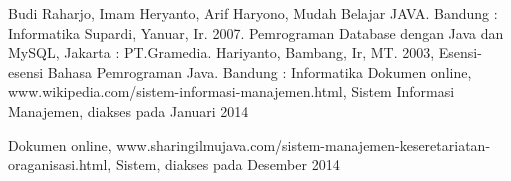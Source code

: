 \documentclass{jtetiproposalskripsi}
\begin{document}

\begin{thebibliography}{9}

Budi Raharjo, Imam Heryanto, Arif Haryono, Mudah Belajar JAVA. Bandung : Informatika
Supardi, Yanuar, Ir. 2007. Pemrograman Database dengan Java dan MySQL, Jakarta : PT.Gramedia.
Hariyanto, Bambang, Ir, MT. 2003, Esensi-esensi Bahasa Pemrograman Java. Bandung : Informatika
Dokumen online, www.wikipedia.com/sistem-informasi-manajemen.html, Sistem Informasi Manajemen, diakses pada Januari 2014

Dokumen online, www.sharingilmujava.com/sistem-manajemen-keseretariatan-oraganisasi.html, Sistem, diakses pada Desember 2014

\end{thebibliography}
\end{document}
